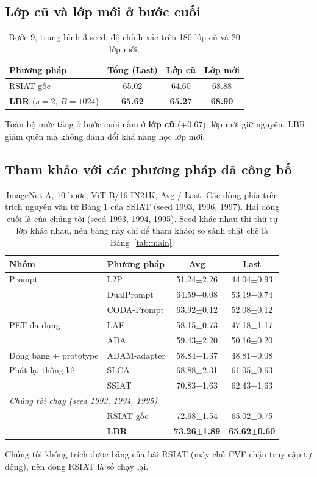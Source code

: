 \documentclass[11pt]{article}
\begin{document}
\subsection{Lớp cũ và lớp mới ở bước cuối}
\begin{table}[H]
\centering\small
\caption{Bước 9, trung bình 3 seed: độ chính xác trên 180 lớp cũ và 20 lớp mới.}
\label{tab:oldnew}
\begin{tabular}{lccc}
\toprule
Phương pháp & Tổng (Last) & Lớp cũ & Lớp mới\\
\midrule
RSIAT gốc & 65.02 & 64.60 & 68.88\\
\textbf{LBR} ($s{=}2$, $B{=}1024$) & \textbf{65.62} & \textbf{65.27} & \textbf{68.90}\\
\bottomrule
\end{tabular}
\end{table}
Toàn bộ mức tăng ở bước cuối nằm ở \textbf{lớp cũ} ($+0.67$); lớp mới giữ nguyên. LBR giảm quên mà không đánh đổi khả
năng học lớp mới.

\subsection{Tham khảo với các phương pháp đã công bố}
\begin{table}[H]
\centering\small
\caption{ImageNet-A, 10 bước, ViT-B/16-IN21K, Avg / Last. Các dòng phía trên trích nguyên văn từ Bảng 1 của SSIAT
\cite{ssiat} (seed 1993, 1996, 1997). Hai dòng cuối là của chúng tôi (seed 1993, 1994, 1995). Seed khác nhau thì thứ tự
lớp khác nhau, nên bảng này chỉ để tham khảo; so sánh chặt chẽ là Bảng~\ref{tab:main}.}
\label{tab:published}
\begin{tabular}{llcc}
\toprule
Nhóm & Phương pháp & Avg & Last\\
\midrule
Prompt & L2P \cite{l2p} & 51.24$\pm$2.26 & 44.04$\pm$0.93\\
 & DualPrompt \cite{dualprompt} & 64.59$\pm$0.08 & 53.19$\pm$0.74\\
 & CODA-Prompt \cite{codaprompt} & 63.92$\pm$0.12 & 52.08$\pm$0.12\\
PET đa dụng & LAE \cite{lae} & 58.15$\pm$0.73 & 47.18$\pm$1.17\\
 & ADA \cite{ada} & 59.43$\pm$2.20 & 50.16$\pm$0.20\\
Đóng băng + prototype & ADAM-adapter \cite{aper} & 58.84$\pm$1.37 & 48.81$\pm$0.08\\
Phát lại thống kê & SLCA \cite{slca} & 68.88$\pm$2.31 & 61.05$\pm$0.63\\
 & SSIAT \cite{ssiat} & 70.83$\pm$1.63 & 62.43$\pm$1.63\\
\midrule
\multicolumn{4}{l}{\emph{Chúng tôi chạy (seed 1993, 1994, 1995)}}\\
 & RSIAT gốc \cite{rsiat} & 72.68$\pm$1.54 & 65.02$\pm$0.75\\
 & \textbf{LBR} & \textbf{73.26$\pm$1.89} & \textbf{65.62$\pm$0.60}\\
\bottomrule
\end{tabular}
\end{table}
Chúng tôi không trích được bảng của bài RSIAT (máy chủ CVF chặn truy cập tự động), nên dòng RSIAT là số chạy lại.
\end{document}
